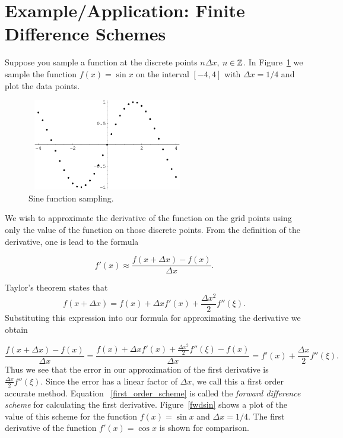 \section{Example/Application: Finite Difference Schemes}


\begin{example}
Suppose you sample a function at the discrete points $n \Delta x$, 
$n \in \mathbb{Z}$.  In Figure~\ref{sindata} we sample the function 
$f(x) = \sin x$ on the interval $[-4,4]$ with $\Delta x = 1/4$ and 
plot the data points.  

\begin{figure}[h!]
\begin{minipage}{\textwidth}
\begin{center}
\includegraphics[height=4cm,width=7cm]{sindata.eps}
\end{center}
\end{minipage}
\caption{Sine function sampling.} %
\label{fig:sindata}
\label{sindata}
\end{figure}


We wish to approximate the derivative of the function on the grid points
using only the value of the function on those discrete points.  From
the definition of the derivative, one is lead to the formula

  \begin{equation}
    \label{first_order_scheme}
    f'(x) \approx \frac{f(x+\Delta x) - f(x)}{\Delta x}.
  \end{equation}

Taylor's theorem states that
  \[
  f(x + \Delta x) = f(x) + \Delta x f'(x) + \frac{\Delta x^2}{2} f''(\xi).
  \]
Substituting this expression into our formula for approximating the derivative
we obtain

  \[
  \frac{f(x+\Delta x) - f(x)}{\Delta x} = \frac{f(x) + \Delta x f'(x)
    + \frac{\Delta x^2}{2} f''(\xi) - f(x) }{\Delta x}
  = f'(x) + \frac{\Delta x}{2} f''(\xi).
  \]
Thus we see that the error in our approximation of the first derivative is
$\frac{\Delta x}{2} f''(\xi)$.  Since the error has a linear factor of 
$\Delta x$, we call this a first order accurate method.  Equation
~\ref{first_order_scheme} is called the 
\textit{forward difference scheme} for calculating the 
first derivative.  Figure~\ref{fwdsin} shows 
a plot of the value of this scheme for the function $f(x) = \sin x$ and 
$\Delta x = 1/4$.  The first derivative of the function $f'(x) = \cos x$ 
is shown for comparison.


\end{example}
